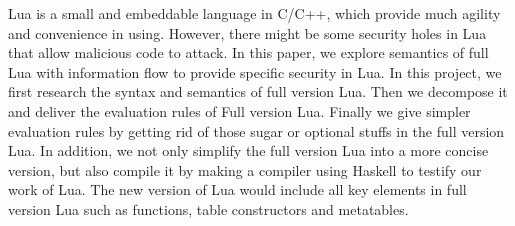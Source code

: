 Lua is a small and embeddable language in C/C++, which provide much agility and convenience in using. However, there might be some security holes in Lua that allow malicious code to attack. In this paper, we explore semantics of full Lua with information flow to provide specific security in Lua. In this project, we first research the syntax and semantics of full version Lua. Then we decompose it and deliver the evaluation rules of Full version Lua. Finally we give simpler evaluation rules by getting rid of those sugar or optional stuffs in the full version Lua. In addition, we not only simplify the full version Lua into a more concise version, but also compile it by making a compiler using Haskell to testify our work of Lua. The new version of Lua would include all key elements in full version Lua such as functions, table constructors and metatables.